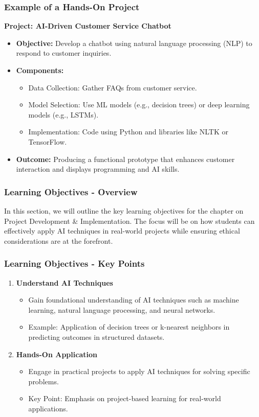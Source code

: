 \documentclass[aspectratio=169]{beamer}
\begin{document}
\begin{frame}[fragile]
    \frametitle{Example of a Hands-On Project}
    \textbf{Project: AI-Driven Customer Service Chatbot}
    \begin{itemize}
        \item \textbf{Objective:} Develop a chatbot using natural language processing (NLP) to respond to customer inquiries.
        \item \textbf{Components:}
            \begin{itemize}
                \item Data Collection: Gather FAQs from customer service.
                \item Model Selection: Use ML models (e.g., decision trees) or deep learning models (e.g., LSTMs).
                \item Implementation: Code using Python and libraries like NLTK or TensorFlow.
            \end{itemize}
        \item \textbf{Outcome:} Producing a functional prototype that enhances customer interaction and displays programming and AI skills.
    \end{itemize}
\end{frame}

\begin{frame}[fragile]
    \frametitle{Learning Objectives - Overview}
    In this section, we will outline the key learning objectives for the chapter on Project Development \& Implementation. 
    The focus will be on how students can effectively apply AI techniques in real-world projects while ensuring ethical considerations are at the forefront.
\end{frame}

\begin{frame}[fragile]
    \frametitle{Learning Objectives - Key Points}
    \begin{enumerate}
        \item \textbf{Understand AI Techniques} 
        \begin{itemize}
            \item Gain foundational understanding of AI techniques such as machine learning, natural language processing, and neural networks.
            \item Example: Application of decision trees or k-nearest neighbors in predicting outcomes in structured datasets.
        \end{itemize}
        
        \item \textbf{Hands-On Application} 
        \begin{itemize}
            \item Engage in practical projects to apply AI techniques for solving specific problems.
            \item Key Point: Emphasis on project-based learning for real-world applications.
        \end{itemize}
    \end{enumerate}
\end{frame}
\end{document}
